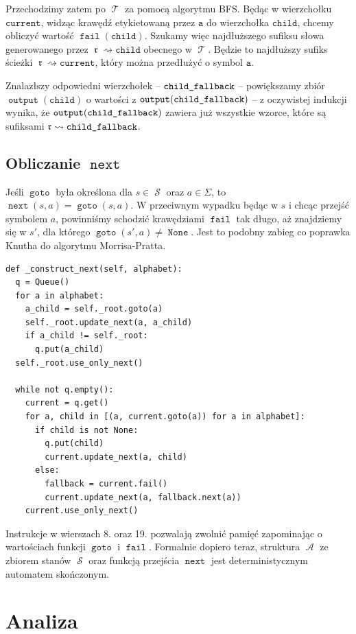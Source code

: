 \documentclass{article}
\DeclareMathOperator{\rot}{\mathfrak{r}}
\DeclareMathOperator{\A}{\mathcal{A}}
\DeclareMathOperator{\states}{\mathcal{S}}
\DeclareMathOperator{\trie}{\mathcal{T}}
\DeclareMathOperator{\goto}{\texttt{goto}}
\DeclareMathOperator{\next}{\texttt{next}}
\DeclareMathOperator{\fail}{\texttt{fail}}
\DeclareMathOperator{\out}{\texttt{output}}
\DeclareMathOperator{\none}{\texttt{None}}
\begin{document}
Przechodzimy zatem po $\trie$ za pomocą algorytmu BFS. Będąc w wierzchołku $\texttt{current}$, widząc krawędź etykietowaną przez $\texttt{a}$ do wierzchołka $\texttt{child}$, chcemy obliczyć wartość $\fail(\texttt{child})$. Szukamy więc najdłuższego sufiksu słowa generowanego przez $\rot\rightsquigarrow\texttt{child}$ obecnego w $\trie$. Będzie to najdłuższy sufiks ścieżki $\rot\rightsquigarrow\texttt{current}$, który można przedłużyć o symbol $\texttt{a}$.

Znalazłszy odpowiedni wierzchołek -- $\texttt{child\textunderscore fallback}$ -- powiększamy zbiór $\out(\texttt{child})$ o wartości z  $\out(\texttt{child\textunderscore fallback})$ -- z oczywistej indukcji wynika, że $\out(\texttt{child\textunderscore fallback})$ zawiera już wszystkie wzorce, które są sufiksami $\rot\rightsquigarrow\texttt{child\textunderscore fallback}$.

\subsection{Obliczanie $\next$}

Jeśli $\goto$ była określona dla $s\in\states$ oraz $a\in\Sigma$, to $\next(s, a) = \goto(s, a)$. W przeciwnym wypadku będąc w $s$ i chcąc przejść symbolem $a$, powinniśmy schodzić krawędziami $\fail$ tak długo, aż znajdziemy się w $s'$, dla którego $\goto(s', a)\neq\none$. Jest to podobny zabieg co poprawka Knutha do algorytmu Morrisa-Pratta.
\begin{verbatim}
def _construct_next(self, alphabet):
  q = Queue()
  for a in alphabet:
    a_child = self._root.goto(a)
    self._root.update_next(a, a_child)
    if a_child != self._root:
      q.put(a_child)
  self._root.use_only_next()

  while not q.empty():
    current = q.get()
    for a, child in [(a, current.goto(a)) for a in alphabet]:
      if child is not None:
        q.put(child)
        current.update_next(a, child)
      else:
        fallback = current.fail()
        current.update_next(a, fallback.next(a))
    current.use_only_next()
\end{verbatim}

Instrukcje w wierszach 8. oraz 19. pozwalają zwolnić pamięć zapominając o wartościach funkcji $\goto$ i $\fail$. Formalnie dopiero teraz, struktura $\A$ ze zbiorem stanów $\states$ oraz funkcją przejścia $\next$ jest deterministycznym automatem skończonym.

\section{Analiza}
\end{document}
